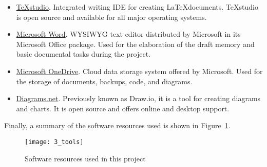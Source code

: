 \begin{itemize}
\item \href{https://www.texstudio.org/}{{\TeX}studio}. Integrated writing IDE for creating \LaTeX documents. {\TeX}studio is open source and available for all major operating systems.\newline

\item \href{https://www.microsoft.com/en-us/microsoft-365/word/}{Microsoft Word}. WYSIWYG text editor distributed by Microsoft in its Microsoft Office package. Used for the elaboration of the draft memory and basic documental tasks during the project.\newline

\item \href{https://www.microsoft.com/en-us/microsoft-365/onedrive/online-cloud-storage/}{Microsoft OneDrive}. Cloud data storage system offered by Microsoft. Used for the storage of documents, backups, code, and diagrams.\newline

\item \href{https://www.diagrams.net/}{Diagrams.net}. Previously known as Draw.io, it is a tool for creating diagrams and charts. It is open source and offers online and desktop support.\newline

\end{itemize}

Finally, a summary of the software resources used is shown in Figure~\ref{fig:swResources}.

\begin{figure}[htb]
	\centering
	\texttt{[image: 3\_tools]}
	\caption[Software resources]{Software resources used in this project}
	\label{fig:swResources}
\end{figure}


